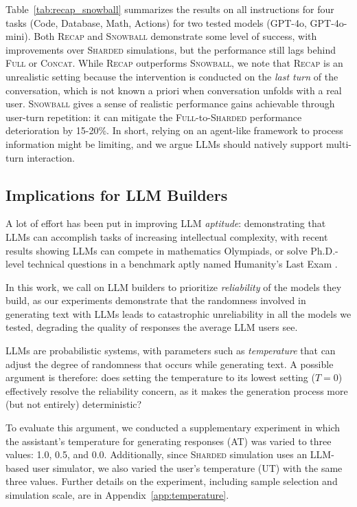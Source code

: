 \documentclass{article}
\newcommand{\fullt}{\textsc{Full}\xspace}
\newcommand{\concatt}{\textsc{Concat}\xspace}
\newcommand{\shardedt}{\textsc{Sharded}\xspace}
\newcommand{\snowballt}{\textsc{Snowball}\xspace}
\newcommand{\recapt}{\textsc{Recap}\xspace}
\begin{document}
Table~\ref{tab:recap_snowball} summarizes the results on all instructions for four tasks (Code, Database, Math, Actions) for two tested models (GPT-4o, GPT-4o-mini). Both \recapt and \snowballt demonstrate some level of success, with improvements over \shardedt simulations, but the performance still lags behind \fullt or \concatt. While \recapt outperforms \snowballt, we note that \recapt is an unrealistic setting because the intervention is conducted on the \textit{last turn} of the conversation, which is not known a priori when conversation unfolds with a real user. \snowballt gives a sense of realistic performance gains achievable through user-turn repetition: it can mitigate the \fullt-to-\shardedt performance deterioration by 15-20\%. In short, relying on an agent-like framework to process information might be limiting, and we argue LLMs should natively support multi-turn interaction.

\subsection{Implications for LLM Builders} \label{sec:implications_llms}

A lot of effort has been put in improving LLM \textit{aptitude}: demonstrating that LLMs can accomplish tasks of increasing intellectual complexity, with recent results showing LLMs can compete in mathematics Olympiads, or solve Ph.D.-level technical questions in a benchmark aptly named Humanity's Last Exam \cite{phan2025humanity}.

In this work, we call on LLM builders to prioritize \textit{reliability} of the models they build, as our experiments demonstrate that the randomness involved in generating text with LLMs leads to catastrophic unreliability in all the models we tested, degrading the quality of responses the average LLM users see.

LLMs are probabilistic systems, with parameters such as \textit{temperature} that can adjust the degree of randomness that occurs while generating text. A possible argument is therefore: does setting the temperature to its lowest setting ($T=0$) effectively resolve the reliability concern, as it makes the generation process more (but not entirely) deterministic?

To evaluate this argument, we conducted a supplementary experiment in which the assistant's temperature for generating responses (AT) was varied to three values: 1.0, 0.5, and 0.0. Additionally, since \shardedt simulation uses an LLM-based user simulator, we also varied the user's temperature (UT) with the same three values. Further details on the experiment, including sample selection and simulation scale, are in Appendix~\ref{app:temperature}.
\end{document}
